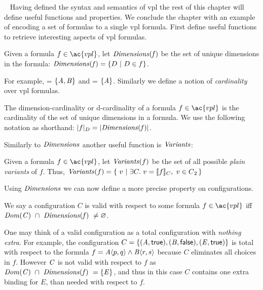 ~\label{section:vpl:formalism}
%
Having defined the syntax and semantics of \ac{vpl} the rest of this chapter
will define useful functions and properties. We conclude the chapter with an
example of encoding a set of \pl{} formulas to a single \ac{vpl} formula.
%
First define useful functions to retrieve interesting aspects of \ac{vpl}
formulas.

\begin{definition}[Dimensions]
  Given a formula $f \in \ac{vpl}$, let $\mathit{Dimensions(f)}$ be the set of unique
  dimensions in the formula:  $\mathit{Dimensions(f)} = \{ D\ |\ D \in f \}$.
\end{definition}

For example,  = $\{\mathit{A,B}\}$ and
 = $\{\mathit{A}\}$.
%
Similarly we define a notion of \emph{cardinality} over \ac{vpl} formulas.
%
\begin{definition}
  The dimension-cardinality or d-cardinality of a formula $f \in \ac{vpl}$ is
  the cardinality of the set of unique dimensions in a formula. We use the
  following notation as shorthand: $|f|_{D} = |{\mathit{Dimensions(f)}}|$.
\end{definition}

Similarly to $\mathit{Dimensions}$ another useful function is $\mathit{Variants}$:

\begin{definition}[Variants]
  Given a formula $f \in \ac{vpl}$, let $\mathit{Variants}(f)$ be the set of all
  possible \emph{plain variants} of $f$. Thus, $\variants{f} = \{\ v\ |\ \exists C.\
  v = \sem[C]{f},\ v \in \pl{} \,\}$
\end{definition}

Using $\mathit{Dimensions}$ we can now define a more precise property on
configurations.
%
\begin{definition}
  We say a configuration $C$ is valid with respect to some formula $f \in
  \ac{vpl}$ iff $\kf{Dom(C)}\ \cap\ \kf{Dimensions(\kf{f})\ \neq \varnothing}$.
\end{definition}

One may think of a valid configuration as a total configuration with
\emph{nothing extra}. For example, the configuration $C = \{\kf{(A,\true),
  (B,\false),(E,\true)}\}$ is total with respect to the formula $f =
\chc[A]{p,q}\wedge\chc[B]{r,s}$ because $C$ eliminates all choices in $f$.
However $\mathit{C}$ is not valid with respect to $f$ as $\mathit{Dom(C)}\ \cap\
\mathit{Dimensions(\mathit{f})\ = \{\mathit{E}\}}$, and thus in this case $C$ contains one
extra binding for $E$, than needed with respect to $f$.

